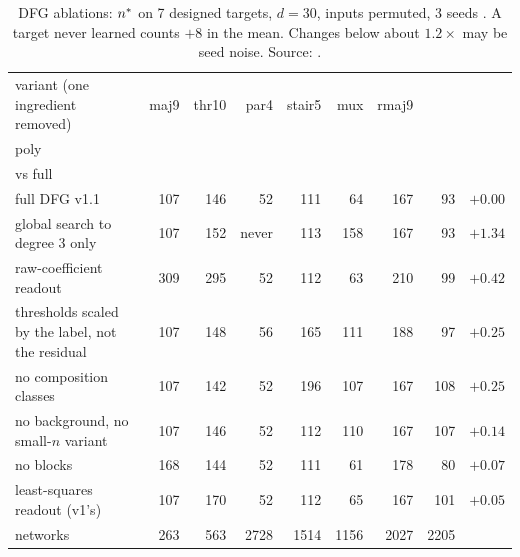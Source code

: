 \begin{table}[t]
\centering\footnotesize\setlength{\tabcolsep}{4pt}
\begin{tabularx}{\linewidth}{>{\raggedright\arraybackslash}Xrrrrrrrr}
\toprule
variant (one ingredient removed) & maj9 & thr10 & par4 & stair5 & mux & rmaj9 & \hd{sparse-\\poly} & \hd{mean $\log_2$\\vs full}\\
\midrule
full DFG v1.1 & 107 & 146 & 52 & 111 & 64 & 167 & 93 & $+0.00$\\
global search to degree 3 only & 107 & 152 & never & 113 & 158 & 167 & 93 & $+1.34$\\
raw-coefficient readout & 309 & 295 & 52 & 112 & 63 & 210 & 99 & $+0.42$\\
thresholds scaled by the label, not the residual & 107 & 148 & 56 & 165 & 111 & 188 & 97 & $+0.25$\\
no composition classes & 107 & 142 & 52 & 196 & 107 & 167 & 108 & $+0.25$\\
no background, no small-$n$ variant & 107 & 146 & 52 & 112 & 110 & 167 & 107 & $+0.14$\\
no blocks & 168 & 144 & 52 & 111 & 61 & 178 & 80 & $+0.07$\\
least-squares readout (v1's) & 107 & 170 & 52 & 112 & 65 & 167 & 101 & $+0.05$\\
\midrule
networks & 263 & 563 & 2728 & 1514 & 1156 & 2027 & 2205 & \\
\bottomrule
\end{tabularx}
\caption{DFG ablations: $n^{*}$ on 7 designed targets, $d=30$, inputs permuted, 3 seeds . A target never learned counts $+8$ in the mean. Changes below about $1.2\times$ may be seed noise. Source: .}
\label{tab:dfgabl}
\end{table}

